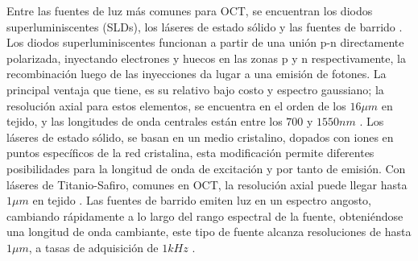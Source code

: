 
Entre las fuentes de luz más comunes para OCT, se encuentran los diodos superluminiscentes (SLDs)\cite{Ko2004}, los láseres de estado sólido \cite{Drexler1999} y las fuentes de barrido \cite{Choma2003}. Los diodos superluminiscentes funcionan a partir de una unión p-n directamente polarizada, inyectando electrones y huecos en las zonas p y n respectivamente, la recombinación luego de las inyecciones da lugar a una emisión de fotones. La principal ventaja que tiene, es su relativo bajo costo y espectro gaussiano; la resolución axial para estos elementos, se encuentra en el orden de los $16\mu m$ en tejido, y las longitudes de onda centrales están entre los $700$ y $1550nm$ \cite{Ko2004}. Los láseres de estado sólido, se basan en un medio cristalino, dopados con iones en puntos específicos de la red cristalina, esta modificación permite diferentes posibilidades para la longitud de onda de excitación y por tanto de emisión. Con láseres de Titanio-Safiro, comunes en OCT, la resolución axial puede llegar hasta $1\mu m$ en tejido \cite{Drexler1999}. Las fuentes de barrido emiten luz en un espectro angosto, cambiando rápidamente a lo largo del rango espectral de la fuente, obteniéndose una longitud de onda cambiante, este tipo de fuente alcanza resoluciones de hasta $1\mu m$, a tasas de adquisición de $1kHz$ \cite{Choma2003}.

